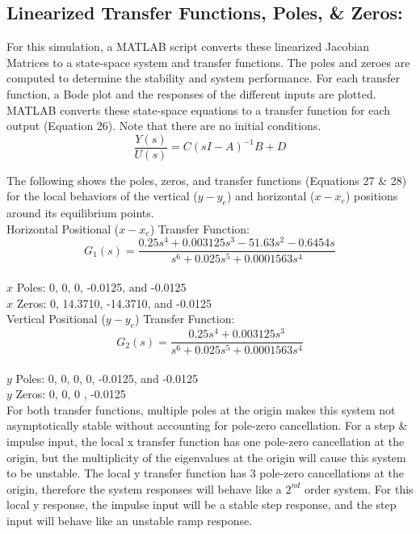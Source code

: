 \documentclass[conference]{IEEEtran}
\begin{document}
\newpage
\subsection{Linearized Transfer Functions, Poles, \& Zeros:}
For this simulation, a MATLAB script converts these linearized Jacobian Matrices to a state-space system and transfer functions. The poles and zeroes are computed to determine the stability and system performance. For each transfer function, a Bode plot and the responses of the different inputs are plotted. \\

MATLAB converts these state-space equations to a transfer function for each output (Equation 26). Note that there are no initial conditions.
\[
 \frac{Y(s)}{U(s)} = C(sI-A)^{-1}B+D \tag{26}
\]

The following shows the poles, zeros, and transfer functions (Equations 27 \& 28) for the local behaviors of the vertical ($y - y_e$) and horizontal ($x - x_e$) positions around its equilibrium points.\\

Horizontal Positional ($x - x_e$) Transfer Function:\\
\[
G_1(s) = \frac{0.25 s^4 + 0.003125 s^3 - 51.63 s^2 - 0.6454 s}{s^6 + 0.025 s^5 + 0.0001563 s^4} \tag{27}
\]
\\
\noindent $x$ Poles: 0, 0, 0, -0.0125, and -0.0125\\
$x$ Zeros: 0, 14.3710, -14.3710, and -0.0125\\

Vertical Positional ($y - y_e$) Transfer Function:
\[
G_2(s) = \frac{0.25 s^4 + 0.003125 s^3}{s^6 + 0.025 s^5 + 0.0001563 s^4} \tag{28}
\]
\\
$y$ Poles: 0, 0, 0, 0, -0.0125, and -0.0125\\
$y$ Zeros: 0, 0, 0 , -0.0125\\

For both transfer functions, multiple poles at the origin makes this system not asymptotically stable without accounting for pole-zero cancellation. For a step \& impulse input, the local x transfer function has one pole-zero cancellation at the origin, but the multiplicity of the eigenvalues at the origin will cause this system to be unstable. The local y transfer function has 3 pole-zero cancellations at the origin, therefore the system responses will behave like a $2^{nd}$ order system. For this local y response, the impulse input will be a stable step response, and the step input will behave like an unstable ramp response. 
\end{document}
